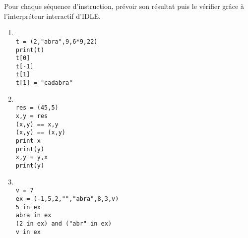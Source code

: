 \exer{}
\setcounter{numques}{0}

Pour chaque séquence d'instruction, prévoir son résultat puis le vérifier grâce à l'interpréteur interactif d'IDLE.

\begin{enumerate}[label=\emph{\alph*)}]
\item 
\begin{lstlisting}

t = (2,"abra",9,6*9,22)
print(t)
t[0]
t[-1]
t[1]
t[1] = "cadabra" 
\end{lstlisting}

\item 
\begin{lstlisting}

res = (45,5)
x,y = res
(x,y) == x,y
(x,y) == (x,y)
print x
print(y)
x,y = y,x
print(y)
\end{lstlisting}

\item 
\begin{lstlisting}

v = 7
ex = (-1,5,2,"","abra",8,3,v)
5 in ex
abra in ex
(2 in ex) and ("abr" in ex)
v in ex
\end{lstlisting}

\end{enumerate}